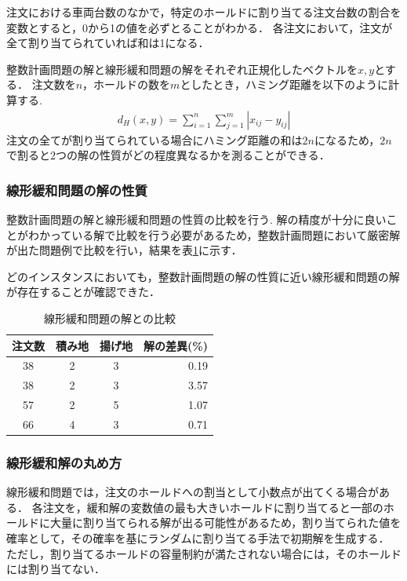 注文における車両台数のなかで，特定のホールドに割り当てる注文台数の割合を変数とすると，0から1の値を必ずとることがわかる．
各注文において，注文が全て割り当てられていれば和は1になる．

整数計画問題の解と線形緩和問題の解をそれぞれ正規化したベクトルを$x,y$とする．
注文数を$n$，ホールドの数を$m$としたとき，ハミング距離を以下のように計算する.
\begin{align*}
 d_H(x,y) =\sum_{i=1}^n \sum_{j=1}^m|x_{ij}-y_{ij}|
\end{align*}
注文の全てが割り当てられている場合にハミング距離の和は$2n$になるため，$2n$で割ると2つの解の性質がどの程度異なるかを測ることができる．


\subsubsection{線形緩和問題の解の性質}
整数計画問題の解と線形緩和問題の性質の比較を行う.
解の精度が十分に良いことがわかっている解で比較を行う必要があるため，整数計画問題において厳密解が出た問題例で比較を行い，結果を表\ref{hamming}に示す．

どのインスタンスにおいても，整数計画問題の解の性質に近い線形緩和問題の解が存在することが確認できた．

\begin{table}[h]
  \centering
  \caption{線形緩和問題の解との比較}
  \label{hamming}
\begin{tabular}{cccr}
\hline
注文数 & 積み地 & 揚げ地 & \multicolumn{1}{c}{解の差異(\%)} \\ \hline
38 & 2   & 3   & 0.19                        \\
38 & 2   & 3   & 3.57                         \\
57 & 2   & 5   & 1.07                         \\
66 & 4   & 3   & 0.71                        \\ \hline
\end{tabular}
\end{table}

\subsubsection{線形緩和解の丸め方}
線形緩和問題では，注文のホールドへの割当として小数点が出てくる場合がある．
各注文を，緩和解の変数値の最も大きいホールドに割り当てると一部のホールドに大量に割り当てられる解が出る可能性があるため，割り当てられた値を確率として，その確率を基にランダムに割り当てる手法で初期解を生成する．
ただし，割り当てるホールドの容量制約が満たされない場合には，そのホールドには割り当てない．


